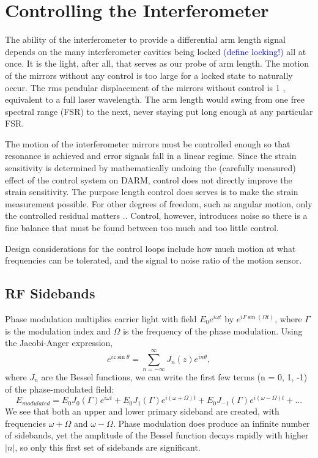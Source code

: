 \section{Controlling the Interferometer}
The ability of the interferometer to provide a differential arm length
signal depends on the many interferometer cavities being locked
\textcolor{blue}{(define locking!)} all at once. It is the light,
after all, that serves as our probe of arm length. The motion of the
mirrors without any control is too large for a locked state to
naturally occur. The rms pendular displacement of the mirrors without
control is 1 \micron, equivalent to a full laser wavelength. The arm
length would swing from one free spectral range (FSR) to the next,
never staying put long enough at any particular FSR.

The motion of the interferometer mirrors must be controlled enough so
that resonance is achieved and error signals fall in a linear
regime. Since the strain sensitivity is determined by mathematically
undoing the (carefully measured) effect of the control system on DARM,
control does not directly improve the strain sensitivity. The purpose
length control does serves is to make the strain measurement
possible. For other degrees of freedom, such as angular motion, only
the controlled residual matters ..
Control, however, introduces noise so there is a fine
balance that must be found between too much and too little control.

Design considerations for the control loops include how much motion at
what frequencies can be tolerated, and the signal to noise ratio of
the motion sensor.


\subsection{RF Sidebands}
Phase modulation multiplies carrier light with field
$E_0e^{i\omega t}$ by $e^{i \Gamma \sin{(\Omega t)}}$, where $\Gamma$
is the modulation index and $\Omega$ is the frequency of the phase
modulation. Using the Jacobi-Anger expression,
\begin{equation}
e^{i z \sin{\theta}} = \sum_{n=-\infty}^{\infty} J_n(z) e^{i n \theta},
\end{equation}
where $J_n$ are the Bessel functions, we can write the first few terms
(n = 0, 1, -1) of the phase-modulated field:
\begin{equation}
E_{modulated} = E_0 J_0(\Gamma) e^{i\omega t} + E_0 J_1(\Gamma)
e^{i(\omega + \Omega) t} + E_0 J_{-1}(\Gamma)
e^{i(\omega - \Omega) t} + ...
\end{equation}
We see that both an upper and lower primary sideband are created, with
frequencies $\omega + \Omega$ and $\omega - \Omega$. Phase modulation
does produce an infinite number of sidebands, yet the amplitude of the
Bessel function decays rapidly with higher $|n|$, so only this first
set of sidebands are significant.




